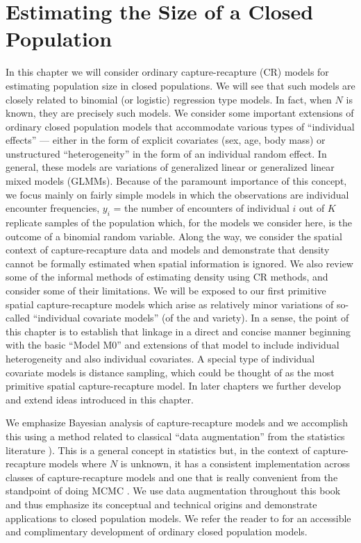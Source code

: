 \chapter{
Estimating the Size of a Closed Population
}
\label{chapt.closed}

\vspace{.3in}

In this chapter we will consider ordinary capture-recapture (CR)
models for estimating population size in closed populations. We will
see that such models are closely related to binomial (or logistic)
regression type models. In fact, when $N$ is known, they are precisely
such models.  We consider some important extensions of ordinary closed
population models that accommodate various types of ``individual
effects'' --- either in the form of explicit covariates (sex, age,
body mass) or unstructured ``heterogeneity'' in the form of an
individual random effect. In general, these models are variations of
generalized linear or generalized linear mixed models (GLMMs).
Because of the paramount importance of this concept, we focus mainly
on fairly simple models in which the observations are individual
encounter frequencies, $y_{i}$ = the number of encounters of
individual $i$ out of $K$ replicate samples of the population which,
for the models we consider here, is the outcome of a binomial random
variable.  Along the way, we consider the spatial context of
capture-recapture data and models and demonstrate that density cannot
be formally estimated when spatial information is ignored. We also
review some of the informal methods of estimating density using CR
methods, and consider some of their limitations.  We will be exposed
to our first primitive spatial capture-recapture models which arise as
relatively minor variations of so-called ``individual covariate
models'' (of the \citet{huggins:1989} and \citet{alho:1990}
variety). In a sense, the point of this chapter is to establish that
linkage in a direct and concise manner beginning with the basic
``Model M0'' and extensions of that model to include individual
heterogeneity and also individual covariates. A special type of
individual covariate models is distance sampling, which could be
thought of as the most primitive spatial capture-recapture model.  In
later chapters we further develop and extend ideas introduced in this
chapter.

We emphasize Bayesian analysis of capture-recapture models and we
accomplish this using a method related to classical ``data
augmentation'' from the statistics literature
\citet[e.g.,][]{tanner_wong:1987}).  This is a general concept in
statistics but, in the context of capture-recapture models where $N$
is unknown, it has a consistent implementation across classes of
capture-recapture models and one that is really convenient from the
standpoint of doing MCMC \citep{royle_etal:2007}. We use data
augmentation throughout this book and thus emphasize its conceptual
and technical origins and demonstrate applications to closed
population models.  We refer the reader to
\citet[][ch. 6]{kery_schaub:2011} for an accessible and complimentary
development of ordinary closed population models.


